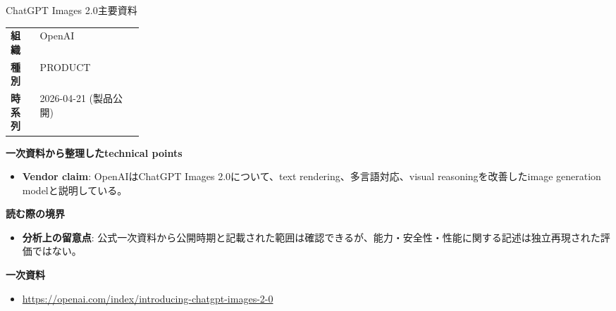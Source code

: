\begin{technicalnote}{ChatGPT Images 2.0}{主要資料}
\begingroup
\begin{tabularx}{\linewidth}{@{}>{\bfseries}p{0.22\linewidth}X@{}}
組織 & OpenAI \\
種別 & PRODUCT \\
時系列 & 2026-04-21 (製品公開) \\
\end{tabularx}
\smallskip
{\bfseries 一次資料から整理したtechnical points}
\begin{itemize}[leftmargin=1.5em,itemsep=0.35em]
\item \textbf{Vendor claim}: OpenAIはChatGPT Images 2.0について、text rendering、多言語対応、visual reasoningを改善したimage generation modelと説明している。
\end{itemize}
{\bfseries 読む際の境界}
\begin{itemize}[leftmargin=1.5em,itemsep=0.35em]
\item \textbf{分析上の留意点}: 公式一次資料から公開時期と記載された範囲は確認できるが、能力・安全性・性能に関する記述は独立再現された評価ではない。
\end{itemize}
\begin{samepage}
{\bfseries 一次資料}
\begingroup\sloppy
\begin{itemize}[leftmargin=1.5em,itemsep=0.25em]
\item {\scriptsize\url{https://openai.com/index/introducing-chatgpt-images-2-0}}
\end{itemize}
\endgroup
\end{samepage}
\endgroup
\end{technicalnote}
\medskip

